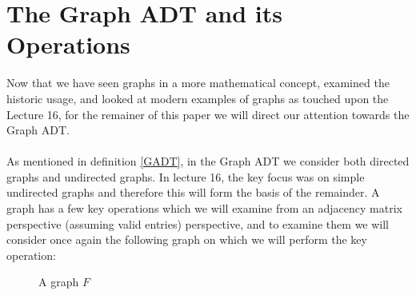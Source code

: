 \documentclass[11pt,reqno]{amsart}
\theoremstyle{definition}
\numberwithin{equation}{section}
\begin{document}
\pagebreak
\section{The Graph ADT and its Operations}
\noindent Now that we have seen graphs in a more mathematical concept, examined the historic usage, and looked at modern examples of graphs as touched upon the Lecture 16, for the remainer of this paper we will direct our attention towards the Graph ADT.\\
\\
As mentioned in definition \ref{GADT}, in the Graph ADT we consider both directed graphs and undirected graphs. In lecture 16, the key focus was on simple undirected graphs and therefore this will form the basis of the remainder. A graph has a few key operations which we will examine from an adjacency matrix perspective (assuming valid entries) perspective, and to examine them we will consider once again the following graph on which we will perform the key operation:
	\begin{figure}[h!]
	\caption{A graph $F$}
	\label{fig:ForestV2}
\end{figure}
\end{document}
